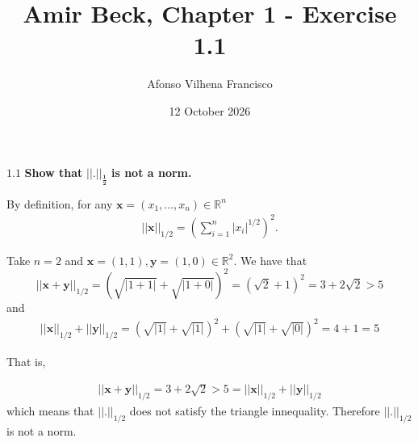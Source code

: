 \documentclass{article}
\title{Amir Beck, Chapter 1 - Exercise 1.1}
\author{Afonso Vilhena Francisco}
\date{12 October 2026}
\begin{document}
\maketitle

$\mathbf{1.1}$ \textbf{Show that} $\mathbf{||.||_\frac{1}{2}}$ \textbf{is not a norm.}

By definition, for any $\mathbf{x}=(x_1,...,x_n) \in \mathbb{R}^n$
\begin{align*}
    ||\mathbf{x}||_{1/2}=\left( \sum_{i=1}^n|x_i|^{1/2} \right)^2.
\end{align*}

Take $n=2$ and $\mathbf{x}=(1,1), \mathbf{y}=(1,0) \in \mathbb{R}^2$. We have that
$$||\mathbf{x}+ \mathbf{y}||_{1/2}=(\sqrt{|1+1|}+\sqrt{|1+0|})^2=(\sqrt{2}+1)^2=3+2\sqrt{2}>5$$
and
\begin{align*}
    ||\mathbf{x}||_{1/2}+||\mathbf{y}||_{1/2}=(\sqrt{|1|}+\sqrt{|1|})^2+(\sqrt{|1|}+\sqrt{|0|})^2=4+1=5
\end{align*}

That is,

\begin{align*}
    ||\mathbf{x}+\mathbf{y}||_{1/2}=3+2\sqrt{2}>5=||\mathbf{x}||_{1/2}+||\mathbf{y}||_{1/2}
\end{align*}
which means that $||.||_{1/2}$ does not satisfy the triangle innequality. Therefore $||.||_{1/2}$ is not a norm.
\end{document}
